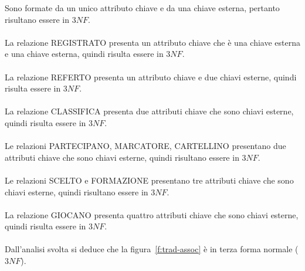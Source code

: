 Sono formate da un unico attributo chiave e da una chiave esterna, pertanto risultano essere in $3NF$. \\
\\
La relazione REGISTRATO presenta un attributo chiave che è una chiave esterna e una chiave esterna, quindi risulta essere in $3NF$. \\
\\
La relazione REFERTO presenta un attributo chiave e due chiavi esterne, quindi risulta essere in $3NF$. \\
\\
La relazione CLASSIFICA presenta due attributi chiave che sono chiavi esterne, quindi risulta essere in $3NF$. \\
\\
Le relazioni PARTECIPANO, MARCATORE, CARTELLINO presentano due attributi chiave che sono chiavi esterne, quindi risultano essere in $3NF$. \\
\\
Le relazioni SCELTO e FORMAZIONE presentano tre attributi chiave che sono chiavi esterne, quindi risultano essere in $3NF$. \\
\\
La relazione GIOCANO presenta quattro attributi chiave che sono chiavi esterne, quindi risulta essere in $3NF$. \\
\\
Dall'analisi svolta si deduce che la figura~\vref{f:trad-assoc} è in terza forma normale ($3NF$).
